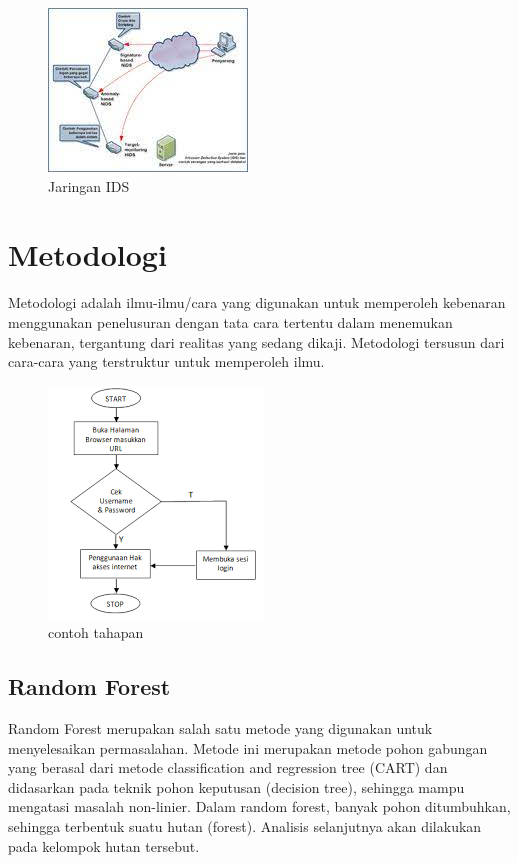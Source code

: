 \documentclass[conference]{IEEEtran}
\begin{document}
\begin{figure}
\centering
\includegraphics[width=.4\textwidth]{Gambar/gambar6.jpg}
\caption{Jaringan IDS}
\end{figure}

\section{Metodologi}

Metodologi adalah ilmu-ilmu/cara yang digunakan untuk memperoleh kebenaran menggunakan penelusuran dengan tata cara tertentu dalam menemukan kebenaran, tergantung dari realitas yang sedang dikaji. Metodologi tersusun dari cara-cara yang terstruktur untuk memperoleh ilmu.

\begin{figure}
\centering
\includegraphics[width=.4\textwidth]{Gambar/gambar5.png}
\caption{contoh tahapan}
\end{figure}

\subsection{Random Forest}
Random Forest merupakan salah satu metode yang digunakan untuk menyelesaikan permasalahan. Metode ini merupakan metode pohon gabungan yang berasal dari metode
classification and regression tree (CART) dan didasarkan pada
teknik pohon keputusan (decision tree), sehingga mampu mengatasi masalah non-linier. Dalam random forest, banyak pohon
ditumbuhkan, sehingga terbentuk suatu hutan (forest). Analisis
selanjutnya akan dilakukan pada kelompok hutan tersebut.
\end{document}
